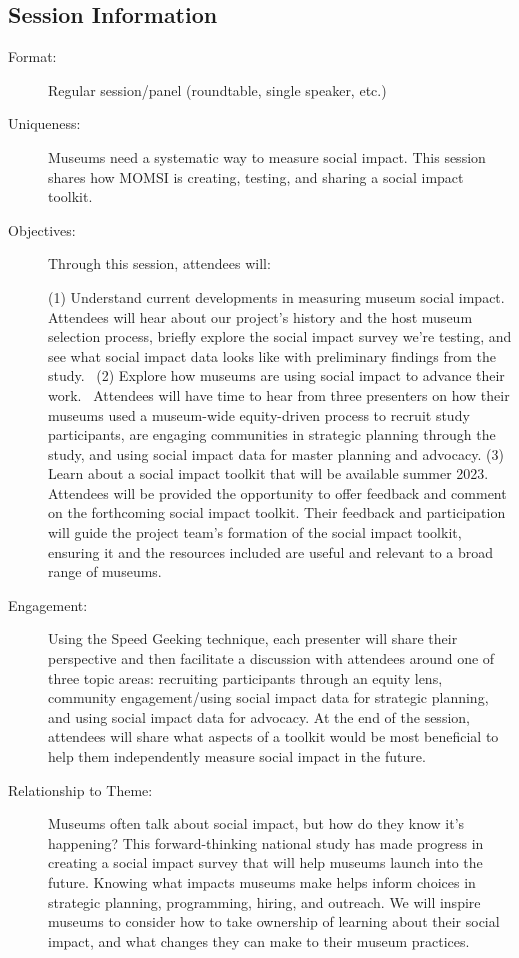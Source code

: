 \documentclass{report}
\begin{document}
              \subsection*{Session Information}
                \begin{description}
                  \item [Format:] Regular session/panel (roundtable, single speaker, etc.)
							    
							    \item [Uniqueness:]Museums need a systematic way to measure social impact. This session shares how MOMSI is creating, testing, and sharing a social impact toolkit.
							    \item [Objectives:]Through this session, attendees will:

(1) Understand current developments in measuring museum social impact. Attendees will hear about our project’s history and the host museum selection process, briefly explore the social impact survey we’re testing, and see what social impact data looks like with preliminary findings from the study. 
(2) Explore how museums are using social impact to advance their work.  Attendees will have time to hear from three presenters on how their museums used a museum-wide equity-driven process to recruit study participants, are engaging communities in strategic planning through the study, and using social impact data for master planning and advocacy.
(3) Learn about a social impact toolkit that will be available summer 2023. Attendees will be provided the opportunity to offer feedback and comment on the forthcoming social impact toolkit. Their feedback and participation will guide the project team’s formation of the social impact toolkit, ensuring it and the resources included are useful and relevant to a broad range of museums.
							    \item [Engagement:]Using the Speed Geeking technique, each presenter will share their perspective and then facilitate a discussion with attendees around one of three topic areas: recruiting participants through an equity lens, community engagement/using social impact data for strategic planning, and using social impact data for advocacy. At the end of the session, attendees will share what aspects of a toolkit would be most beneficial to help them independently measure social impact in the future.
							    \item [Relationship to Theme:]Museums often talk about social impact, but how do they know it’s happening? This forward-thinking national study has made progress in creating a social impact survey that will help museums launch into the future. Knowing what impacts museums make helps inform choices in strategic planning, programming, hiring, and outreach. We will inspire museums to consider how to take ownership of learning about their social impact, and what changes they can make to their museum practices.
							    
                \end{description}
\end{document}
